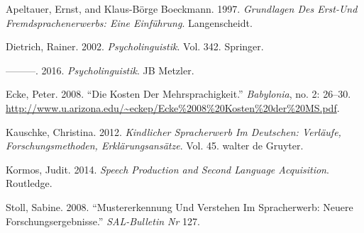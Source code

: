 \documentclass[
  letterpaper,
]{scrbook}
\newlength{\cslhangindent}
\newlength{\cslentryspacingunit} %
\newenvironment{CSLReferences}[2] %
 {%
  \setlength{\parindent}{0pt}
  \ifodd #1
  \let\oldpar\par
  \def\par{\hangindent=\cslhangindent\oldpar}
  \fi
  \setlength{\parskip}{#2\cslentryspacingunit}
 }%
 {}
\begin{document}
\hypertarget{refs}{}
\begin{CSLReferences}{1}{0}
\leavevmode{}%
Apeltauer, Ernst, and Klaus-Börge Boeckmann. 1997. \emph{Grundlagen Des
Erst-Und Fremdsprachenerwerbs: Eine Einf{ü}hrung}. Langenscheidt.

\leavevmode{}%
Dietrich, Rainer. 2002. \emph{Psycholinguistik}. Vol. 342. Springer.

\leavevmode{}%
---------. 2016. \emph{Psycholinguistik}. JB Metzler.

\leavevmode{}%
Ecke, Peter. 2008. {``Die Kosten Der Mehrsprachigkeit.''}
\emph{Babylonia}, no. 2: 26--30.
\url{http://www.u.arizona.edu/~eckep/Ecke\%2008\%20Kosten\%20der\%20MS.pdf}.

\leavevmode{}%
Kauschke, Christina. 2012. \emph{Kindlicher Spracherwerb Im Deutschen:
Verl{ä}ufe, Forschungsmethoden, Erkl{ä}rungsans{ä}tze}. Vol. 45. walter
de Gruyter.

\leavevmode{}%
Kormos, Judit. 2014. \emph{Speech Production and Second Language
Acquisition}. Routledge.

\leavevmode{}%
Stoll, Sabine. 2008. {``Mustererkennung Und Verstehen Im Spracherwerb:
Neuere Forschungsergebnisse.''} \emph{SAL-Bulletin Nr} 127.

\end{CSLReferences}


\backmatter

\printindex
\end{document}
